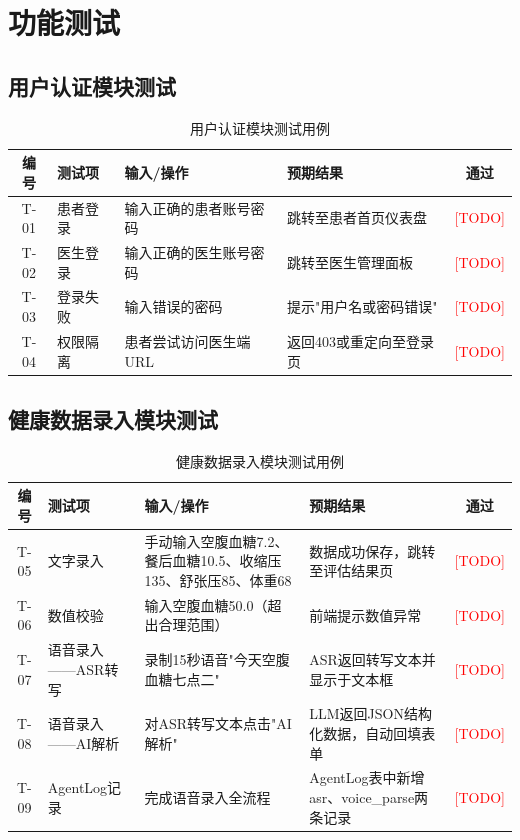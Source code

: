 \section{功能测试}

\subsection{用户认证模块测试}

\begin{table}[H]
\centering
\caption{用户认证模块测试用例}
\label{tab:test-auth}
\begin{tabularx}{\textwidth}{|c|l|X|X|c|}
\hline
\textbf{编号} & \textbf{测试项} & \textbf{输入/操作} & \textbf{预期结果} & \textbf{通过} \\
\hline
T-01 & 患者登录 & 输入正确的患者账号密码 & 跳转至患者首页仪表盘 & \textcolor{red}{[TODO]} \\
\hline
T-02 & 医生登录 & 输入正确的医生账号密码 & 跳转至医生管理面板 & \textcolor{red}{[TODO]} \\
\hline
T-03 & 登录失败 & 输入错误的密码 & 提示"用户名或密码错误" & \textcolor{red}{[TODO]} \\
\hline
T-04 & 权限隔离 & 患者尝试访问医生端URL & 返回403或重定向至登录页 & \textcolor{red}{[TODO]} \\
\hline
\end{tabularx}
\end{table}

\subsection{健康数据录入模块测试}

\begin{table}[H]
\centering
\caption{健康数据录入模块测试用例}
\label{tab:test-health-input}
\begin{tabularx}{\textwidth}{|c|l|X|X|c|}
\hline
\textbf{编号} & \textbf{测试项} & \textbf{输入/操作} & \textbf{预期结果} & \textbf{通过} \\
\hline
T-05 & 文字录入 & 手动输入空腹血糖7.2、餐后血糖10.5、收缩压135、舒张压85、体重68 & 数据成功保存，跳转至评估结果页 & \textcolor{red}{[TODO]} \\
\hline
T-06 & 数值校验 & 输入空腹血糖50.0（超出合理范围） & 前端提示数值异常 & \textcolor{red}{[TODO]} \\
\hline
T-07 & 语音录入——ASR转写 & 录制15秒语音"今天空腹血糖七点二" & ASR返回转写文本并显示于文本框 & \textcolor{red}{[TODO]} \\
\hline
T-08 & 语音录入——AI解析 & 对ASR转写文本点击"AI解析" & LLM返回JSON结构化数据，自动回填表单 & \textcolor{red}{[TODO]} \\
\hline
T-09 & AgentLog记录 & 完成语音录入全流程 & AgentLog表中新增asr、voice\_parse两条记录 & \textcolor{red}{[TODO]} \\
\hline
\end{tabularx}
\end{table}

